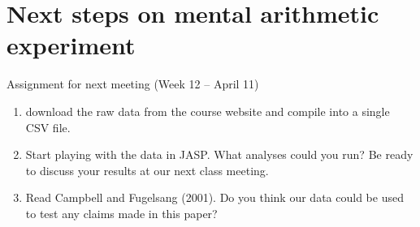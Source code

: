 \documentclass[article,10pt]{article}
\begin{document}
\section*{Next steps on mental arithmetic experiment}
\label{sec-3}
Assignment for next meeting (Week 12 -- April 11)

\begin{enumerate}
\item download the raw data from the course website and compile into a single CSV file.
\item Start playing with the data in JASP.  What analyses could you run?  Be ready to discuss your results at our next class meeting.
\item Read Campbell and Fugelsang (2001).  Do you think our data could be used to test any claims made in this paper?
\end{enumerate}
\end{document}
